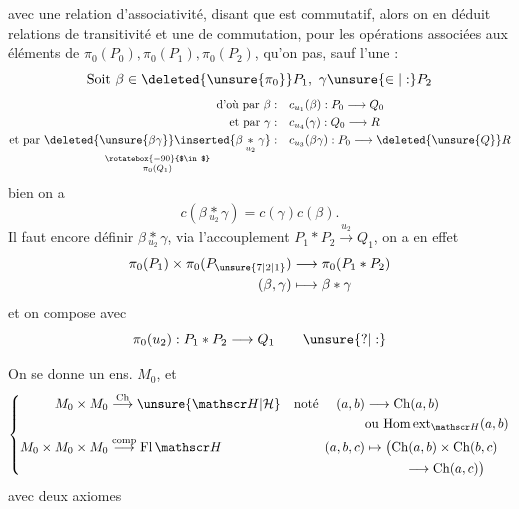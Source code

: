 avec une relation d'associativité, disant que
est commutatif, alors on en déduit   relations de transitivité et une de commutation, pour les opérations associées aux éléments de $\pi_0(P_0),\pi_0(P_1),\pi_0(P_2)$, qu'on  pas, sauf l'une :
\[
\text{Soit }\beta\in\deleted{\unsure{\pi_0}}P_1,\ \gamma\unsure{\in|:}P_2
\]
\[
\begin{aligned}
\text{d'où par }\beta:\quad &c_{u_1}(\beta):P_0\longrightarrow Q_0\\
\text{et par }\gamma:\quad &c_{u_4}(\gamma):Q_0\longrightarrow R\\
\text{et par }\underset{\substack{\rotatebox{-90}{$\in$}\\\pi_0(Q_1)}}{\deleted{\unsure{\beta\gamma}}\inserted{\beta\underset{u_2}{*}\gamma}}:\quad &c_{u_3}(\beta\gamma):P_0\longrightarrow\deleted{\unsure{Q}}R
\end{aligned}
\]
 bien on a
\[
\boxed{c(\beta\underset{u_2}{*}\gamma)=c(\gamma)c(\beta)}.
\]
Il faut encore définir $\beta\underset{u_2}{*}\gamma$, via l'accouplement $P_1*P_2\xrightarrow{u_2}Q_1$, on a en effet
\[
\begin{aligned}
\pi_0(P_1)\times\pi_0(P_{\unsure{7|2|1}})&\longrightarrow\pi_0(P_1*P_2)\\
(\beta,\gamma)&\longmapsto\beta*\gamma
\end{aligned}
\]
et on compose avec
\[
\pi_0(u_2):P_1*P_2\longrightarrow Q_1\qquad\unsure{?|:}
\]

On se donne un ens. $M_0$, et
\[
\left\{\begin{aligned}
M_0\times M_0&\overset{\mathrm{Ch}}{\longrightarrow}\unsure{\mathscr H|\mathcal H}&\text{noté }\quad(a,b)&\longrightarrow\mathrm{Ch}(a,b)\\
&&&\text{ou }\mathrm{Hom}\,\mathrm{ext}_{\mathscr H}(a,b)\\
M_0\times M_0\times M_0&\overset{\mathrm{comp}}{\longrightarrow}\mathrm{Fl}\,\mathscr H &(a,b,c)&\mapsto\bigl(\mathrm{Ch}(a,b)\times\mathrm{Ch}(b,c)\\
&&&\hspace{3em}\longrightarrow\mathrm{Ch}(a,c)\bigr)
\end{aligned}\right.
\]
avec deux axiomes

